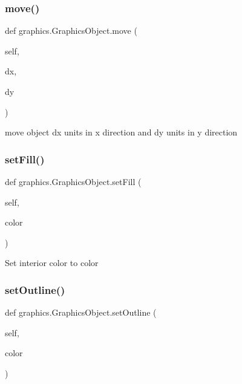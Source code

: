 \subsubsection{\texorpdfstring{move()}{move()}}
{\footnotesize\ttfamily def graphics.\+Graphics\+Object.\+move (\begin{DoxyParamCaption}\item[{}]{self,  }\item[{}]{dx,  }\item[{}]{dy }\end{DoxyParamCaption})}

\begin{DoxyVerb}move object dx units in x direction and dy units in y
direction\end{DoxyVerb}
 \mbox{\label{classgraphics_1_1_graphics_object_acfba33cbf63f5333f961b86e988fc292}} 
\subsubsection{\texorpdfstring{set\+Fill()}{setFill()}}
{\footnotesize\ttfamily def graphics.\+Graphics\+Object.\+set\+Fill (\begin{DoxyParamCaption}\item[{}]{self,  }\item[{}]{color }\end{DoxyParamCaption})}

\begin{DoxyVerb}Set interior color to color\end{DoxyVerb}
 \mbox{\label{classgraphics_1_1_graphics_object_a0acf1399e539cc273170096552a04139}} 
\subsubsection{\texorpdfstring{set\+Outline()}{setOutline()}}
{\footnotesize\ttfamily def graphics.\+Graphics\+Object.\+set\+Outline (\begin{DoxyParamCaption}\item[{}]{self,  }\item[{}]{color }\end{DoxyParamCaption})}

